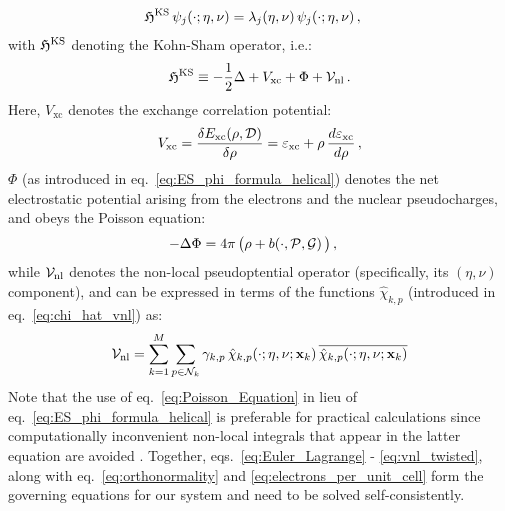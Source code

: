 \documentclass[preprint,12pt, 3p, sort&compress]{elsarticle}
\begin{document}
\begin{align}
\mathfrak{H}^{\text{KS}}\,\psi_j(\cdot;\eta, \nu) &= \lambda_j(\eta, \nu)\,\psi_j(\cdot;\eta, \nu)\,,
\label{eq:Euler_Lagrange}
\end{align}
with $\mathfrak{H}^{\text{KS}}$ denoting the Kohn-Sham operator, i.e.:
\begin{align}
\label{eq:KS_Operator}
\mathfrak{H}^{\text{KS}} \equiv -\frac{1}{2} \Delta + V_{\text{xc}} + \Phi + {\cal V}_{\text{nl}}\,.
\end{align}
Here, $V_{\text{xc}}$ denotes the exchange correlation potential:
\begin{align}
V_{\text{xc}} = \frac{\delta E_{\text{xc}}(\rho, {{\cal D}}) }{\delta \rho} = \varepsilon_{\text{xc}} + \rho \,\frac{d \varepsilon_{\text{xc}}}{d\rho}\,,
\end{align}
$\Phi$ (as introduced in eq.~\ref{eq:ES_phi_formula_helical}) denotes the net electrostatic potential arising from the electrons and the nuclear pseudocharges, and obeys the Poisson equation:
\begin{align}
-\Delta \Phi &= 4\pi\,\big(\rho + b(\cdot,{\cal P} ,{\cal G})\,\big)\,,
\label{eq:Poisson_Equation}
\end{align}
while ${\cal V}_{\text{nl}}$ denotes the non-local pseudoptential operator (specifically, its $(\eta, \nu)$ component), and can be expressed in terms of the functions $\hat{\chi}_{k,p}$ (introduced in eq.~\ref{eq:chi_hat_vnl}) as:
\begin{align}
\label{eq:vnl_twisted}
{{\cal V}}_{\text{nl}} =  \sum_{k=1}^{M}\sum_{p \in {\cal N}_k}\gamma_{k,p}\,\hat{\chi}_{k,p}(\cdot;\eta, \nu;{\bf x}_k)\,\overline{\hat{\chi}_{k,p}(\cdot;\eta, \nu;{\bf x}_k)}
\end{align}
Note that the use of eq.~\ref{eq:Poisson_Equation} in lieu of eq.~\ref{eq:ES_phi_formula_helical} is preferable for practical calculations since computationally inconvenient non-local integrals that appear in the latter equation are avoided  \citep{Pask2005, suryanarayana2014augmented, motamarri2012higher, ghosh2019symmetry}. Together, eqs.~\ref{eq:Euler_Lagrange} - \ref{eq:vnl_twisted}, along with eq.~\ref{eq:orthonormality} and \ref{eq:electrons_per_unit_cell} form the governing equations for our system and need to be solved self-consistently. 
\end{document}
